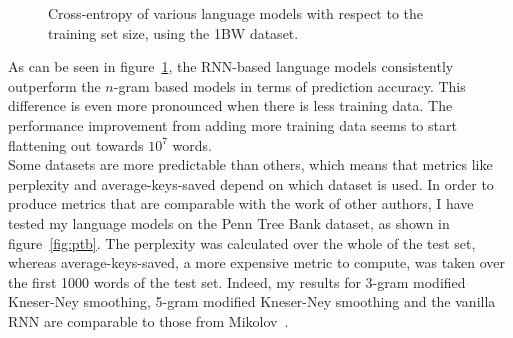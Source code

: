 \documentclass[a4paper, 12pt]{report}
\begin{document}
\begin{figure}[h]
\caption{Cross-entropy of various language models with respect to the training set size, using the 1BW dataset.}
\label{fig:cross_entropy_training_set_size}
\end{figure}

As can be seen in figure~\ref{fig:cross_entropy_training_set_size}, the RNN-based language models consistently outperform the $n$-gram based models in terms of prediction accuracy. This difference is even more pronounced when there is less training data. The performance improvement from adding more training data seems to start flattening out towards $10^7$ words. \\

Some datasets are more predictable than others, which means that metrics like perplexity and average-keys-saved depend on which dataset is used. In order to produce metrics that are comparable with the work of other authors, I have tested my language models on the Penn Tree Bank dataset, as shown in figure~\ref{fig:ptb}. The perplexity was calculated over the whole of the test set, whereas average-keys-saved, a more expensive metric to compute, was taken over the first 1000 words of the test set. Indeed, my results for 3-gram modified Kneser-Ney smoothing, 5-gram modified Kneser-Ney smoothing and the vanilla RNN are comparable to those from Mikolov~\cite{rnn_ptb:mikolov2012}. \\
\end{document}
